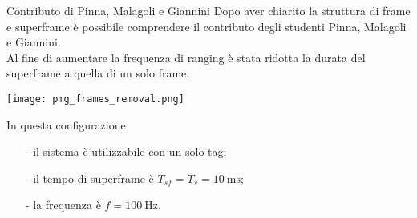 \begin{frame}{Contributo di Pinna, Malagoli e Giannini}
  Dopo aver chiarito la struttura di frame e superframe è possibile comprendere
  il contributo degli studenti Pinna, Malagoli e Giannini.\\
  Al fine di aumentare la frequenza di ranging è stata ridotta la durata del superframe
  a quella di un solo frame.
  \begin{center}
    \texttt{[image: pmg\_frames\_removal.png]}
  \end{center}
  In questa configurazione
  \begin{itemize}
  \item[-] il sistema è utilizzabile con un solo tag;
  \item[-] il tempo di superframe è $T_{sf} = T_s = \SI{10}{\milli\second}$;
  \item[-] la frequenza è $ f = \SI{100}{\hertz}$.
  \end{itemize}
\end{frame}

